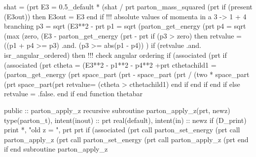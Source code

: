     shat = (prt%
    E3 = 0.5_default * (shat / prt%
         parton_mass_squared (prt%
    if (present (E3out)) then
       E3out = E3
    end if
    !!! absolute values of momenta in a 3 -> 1 + 4 branching
    p3 = sqrt (E3**2 - prt%
    p1 = sqrt (parton_get_energy (prt%
    p4 = sqrt (max (zero, (E3 - parton_get_energy (prt%
         - prt%
    if (p3 > zero) then
       retvalue = ((p1 + p4 >= p3) .and. (p3 >= abs(p1 - p4)) )
       if (retvalue .and. isr_angular_ordered) then
          !!! check angular ordering
          if (associated (prt%
             if (associated (prt%
                ctheta = (E3**2 - p1**2 - p4**2 +prt%
                cthetachild1 = (parton_get_energy (prt%
                     space_part (prt%
                     - space_part (prt%
                     / (two * space_part (prt%
                     space_part(prt%
                retvalue= (ctheta > cthetachild1)
             end if
          end if
       end if
    else
       retvalue = .false.
    end if
  end function thetabar

\eatline
\nwendcode{}\nwdocspar
\nwenddocs{}\plusendmoddef
  public :: parton_apply_z
\nwendcode{}\plusendmoddef
  recursive subroutine parton_apply_z(prt, newz)
    type(parton_t), intent(inout) :: prt
    real(default), intent(in) :: newz
    if (D_print) print *, "old z = ", prt%
    prt%
    if (associated (prt%
       call parton_set_energy (prt%
       call parton_apply_z (prt%
       call parton_set_energy (prt%
       call parton_apply_z (prt%
    end if
  end subroutine parton_apply_z


